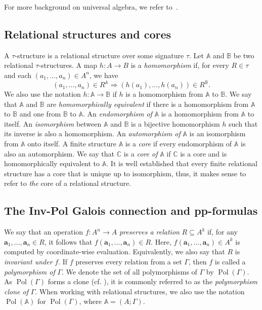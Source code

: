 \documentclass[12pt]{amsart}
\theoremstyle{definition}
\theoremstyle{definition}
\newcommand{\struct}[1]{\mathbb{#1}}
\DeclareMathOperator{\Pol}{Pol}
\begin{document}
For more background on universal algebra, we refer to~\cite{BS}.

\subsection{Relational structures and cores}
A $\tau$-structure is a relational structure over some signature $\tau$. Let $\struct{A}$ and $\struct{B}$ be two relational $\tau$-structures. A map $h\colon A\to B$ is a \emph{homomorphism} if, for every $R\in\tau$ and each $(a_1,\dots, a_n)\in A^n$, we have
\begin{equation*}
    (a_1,\dots,a_n)\in R^\struct{A} \Rightarrow (h(a_1),\dots,h(a_n))\in R^\struct{B}.
\end{equation*}
We also use the notation $h\colon \struct{A} \to \struct{B}$ if $h$ is a homomorphism from $\struct{A}$ to $\struct{B}$. 
We say that $\struct{A}$ and $\struct{B}$ are \emph{homomorphically equivalent} if there is a homomorphism from $\struct{A}$ to $\struct{B}$ and one from $\struct{B}$ to $\struct{A}$. 
An \emph{endomorphism of} $\struct{A}$ is a homomorphism from $\struct{A}$ to itself. An \emph{isomorphism} between $\struct{A}$ and $\struct{B}$ is a bijective homomorphism $h$ such that its inverse is also a homomorphism. An \emph{automorphism of} $\struct{A}$ is an isomorphism from $\struct{A}$ onto itself. A finite structure $\struct{A}$ is a \emph{core} if every endomorphism of $\struct{A}$ is also an automorphism. We say that $\struct{C}$ is a \emph{core of} $\struct{A}$ if $\struct{C}$ is a core and is homomorphically equivalent to $\struct{A}$. It is well established that every finite relational structure has a core that is unique up to isomorphism, thus, it makes sense to refer to \emph{the} core of a relational structure.  


\subsection{The Inv-Pol Galois connection and pp-formulas}\label{sec:InvPol}
We say that an operation $f\colon A^n \to A$ \emph{preserves a relation} $R\subseteq A^k$ if, for any $\boldsymbol{a}_1,\dots, \boldsymbol{a}_n \in R$, it follows that $f(\boldsymbol{a}_1,\dots,\boldsymbol{a}_n) \in R$. Here, $f(\boldsymbol{a}_1,\dots,\boldsymbol{a}_n) \in A^k$ is computed by coordinate-wise evaluation. Equivalently, we also say that $R$ is \emph{invariant under} $f$. If $f$ preserves every relation from a set $\Gamma$, then $f$ is called a \emph{polymorphism of} $\Gamma$. We denote the set of all polymorphisms of $\Gamma$ by $\Pol(\Gamma)$. As $\Pol(\Gamma)$ forms a clone (cf. \cite[Chapter E.]{PosKal79}), it is commonly referred to as the \emph{polymorphism clone of} $\Gamma$. When working with relational structures, we also use the notation $\Pol(\struct{A})$ for $\Pol(\Gamma)$, where $\struct{A}=(A;\Gamma)$. 
    
\end{document}
